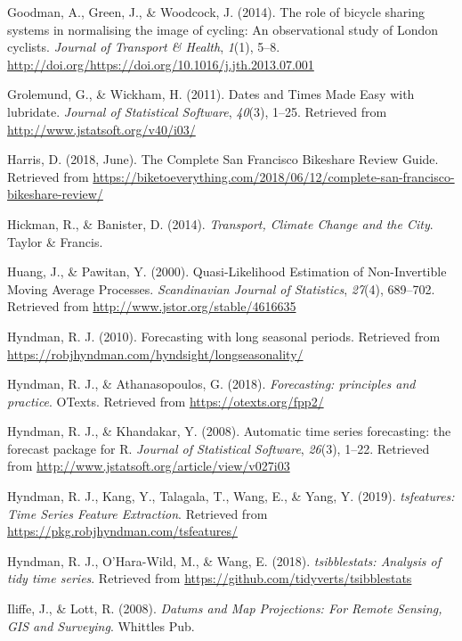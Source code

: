 \documentclass[12pt,oneside]{reedthesis}
\begin{document}
\hypertarget{ref-goodman2014}{}
Goodman, A., Green, J., \& Woodcock, J. (2014). The role of bicycle
sharing systems in normalising the image of cycling: An observational
study of London cyclists. \emph{Journal of Transport \& Health},
\emph{1}(1), 5--8.
\url{http://doi.org/https://doi.org/10.1016/j.jth.2013.07.001}

\hypertarget{ref-lubridate}{}
Grolemund, G., \& Wickham, H. (2011). Dates and Times Made Easy with
lubridate. \emph{Journal of Statistical Software}, \emph{40}(3), 1--25.
Retrieved from \url{http://www.jstatsoft.org/v40/i03/}

\hypertarget{ref-harris2018}{}
Harris, D. (2018, June). The Complete San Francisco Bikeshare Review
Guide. Retrieved from
\url{https://biketoeverything.com/2018/06/12/complete-san-francisco-bikeshare-review/}

\hypertarget{ref-hickman2014}{}
Hickman, R., \& Banister, D. (2014). \emph{Transport, Climate Change and
the City}. Taylor \& Francis.

\hypertarget{ref-huang2000}{}
Huang, J., \& Pawitan, Y. (2000). Quasi-Likelihood Estimation of
Non-Invertible Moving Average Processes. \emph{Scandinavian Journal of
Statistics}, \emph{27}(4), 689--702. Retrieved from
\url{http://www.jstor.org/stable/4616635}

\hypertarget{ref-hyndmanblog}{}
Hyndman, R. J. (2010). Forecasting with long seasonal periods. Retrieved
from \url{https://robjhyndman.com/hyndsight/longseasonality/}

\hypertarget{ref-hyndman2018fpp}{}
Hyndman, R. J., \& Athanasopoulos, G. (2018). \emph{Forecasting:
principles and practice}. OTexts. Retrieved from
\url{https://otexts.org/fpp2/}

\hypertarget{ref-forecast}{}
Hyndman, R. J., \& Khandakar, Y. (2008). Automatic time series
forecasting: the forecast package for R. \emph{Journal of Statistical
Software}, \emph{26}(3), 1--22. Retrieved from
\url{http://www.jstatsoft.org/article/view/v027i03}

\hypertarget{ref-tsfeatures}{}
Hyndman, R. J., Kang, Y., Talagala, T., Wang, E., \& Yang, Y. (2019).
\emph{tsfeatures: Time Series Feature Extraction}. Retrieved from
\url{https://pkg.robjhyndman.com/tsfeatures/}

\hypertarget{ref-tsibblestats}{}
Hyndman, R. J., O'Hara-Wild, M., \& Wang, E. (2018). \emph{tsibblestats:
Analysis of tidy time series}. Retrieved from
\url{https://github.com/tidyverts/tsibblestats}

\hypertarget{ref-iliffe2008}{}
Iliffe, J., \& Lott, R. (2008). \emph{Datums and Map Projections: For
Remote Sensing, GIS and Surveying}. Whittles Pub.
\end{document}
